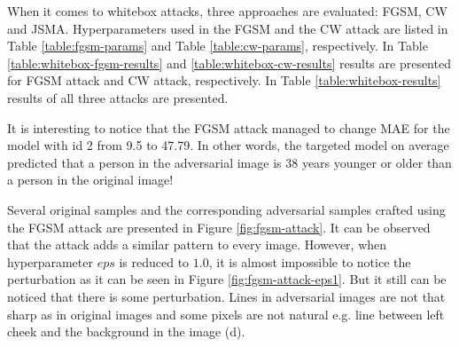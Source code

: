 When it comes to whitebox attacks, three approaches are evaluated: FGSM, CW and JSMA. Hyperparameters used in the FGSM and the CW attack are listed in Table \ref{table:fgsm-params} and Table \ref{table:cw-params}, respectively. In Table \ref{table:whitebox-fgsm-results} and \ref{table:whitebox-cw-results} results are presented for FGSM attack and CW attack, respectively. In Table \ref{table:whitebox-results} results of all three attacks are presented.

It is interesting to notice that the FGSM attack managed to change MAE for the model with id 2 from 9.5 to 47.79. In other words, the targeted model on average predicted that a person in the adversarial image is 38 years younger or older than a person in the original image! 

Several original samples and the corresponding adversarial samples crafted using the FGSM attack are presented in Figure \ref{fig:fgsm-attack}. It can be observed that the attack adds a similar pattern to every image. However, when hyperparameter $eps$ is reduced to $1.0$, it is almost impossible to notice the perturbation as it can be seen in Figure \ref{fig:fgsm-attack-eps1}. But it still can be noticed that there is some perturbation. Lines in adversarial images are not that sharp as in original images and some pixels are not natural e.g. line between left cheek and the background in the image (d).

